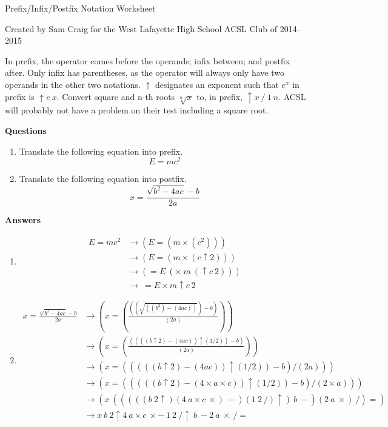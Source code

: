 \documentclass[12pt,letterpaper,fleqn]{article}
\begin{document}
\begin{center}
  Prefix/Infix/Postfix Notation Worksheet

  Created by Sam Craig for the West Lafayette High School ACSL Club of 2014--2015
\end{center}

In prefix, the operator comes before the operands; infix between; and postfix after.
Only infix has parentheses, as the operator will always only have two operands in the other two notations.
$\uparrow$ designates an exponent such that $e^x$ in prefix is $\uparrow e\ x$.
Convert square and n-th roots $\sqrt[n]{x}$ to, in prefix, $\uparrow x\ /\ 1\ n$.
ACSL will probably not have a problem on their test including a square root.

\bigskip
\noindent \textbf{Questions}

\begin{enumerate}

\item Translate the following equation into prefix.
  \[
  E = mc^2
  \]

\item Translate the following equation into postfix.
  \[
  x = \frac{\sqrt{b^2 - 4ac} - b}{2a}
  \]

\end{enumerate}

\pagebreak
\noindent \textbf{Answers}

\begin{enumerate}

\item \begin{align*}
  E = mc^2 &\rightarrow (E = (m \times (c^2))) \\
  &\rightarrow (E = (m \times (c \uparrow 2))) \\
  &\rightarrow (= E\ (\times\ m\ (\uparrow c\ 2))) \\
  &\rightarrow\ = E \times m \uparrow c\ 2
\end{align*}

\item \begin{align*}
  x = \frac{\sqrt{b^2 - 4ac} - b}{2a} &\rightarrow \left(x = \left(\frac{\left(\left(\sqrt{((b^2) - (4ac))}\right) - b\right)}{(2a)}\right)\right) \\
  &\rightarrow \left(x = \left(\frac{\left(\left(((b \uparrow 2) - (4ac)) \uparrow (1/2) \right) - b\right)}{(2a)}\right)\right) \\
  &\rightarrow (x = (((((b \uparrow 2) - (4ac)) \uparrow (1/2)) - b) / (2a))) \\
  &\rightarrow (x = (((((b \uparrow 2) - (4 \times a \times c)) \uparrow (1/2)) - b) / (2 \times a))) \\
  &\rightarrow (x\ (((((b\ 2 \uparrow) (4\ a \times c\ \times)\ -) (1\ 2\ /) \uparrow)\ b\ -) (2\ a\ \times)\ /) =) \\
  &\rightarrow x\ b\ 2 \uparrow 4\ a \times c\ \times -\ 1\ 2\ / \uparrow\ b\ - 2\ a\ \times\ / =
\end{align*}

\end{enumerate}
\end{document}
